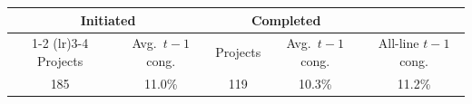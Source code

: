 \begin{table}[!htbp]
\centering
\small
\setlength{\tabcolsep}{6pt}
\renewcommand{\arraystretch}{1.00}
\begin{tabular}{@{}ccccc@{}}
\toprule
\multicolumn{2}{c}{Initiated} & \multicolumn{2}{c}{Completed} & \\
\cmidrule(lr){1-2} \cmidrule(lr){3-4}
Projects & Avg.\ $t\!-\!1$ cong. & Projects & Avg.\ $t\!-\!1$ cong. & All-line $t\!-\!1$ cong. \\
\midrule
185 & 11.0\% & 119 & 10.3\% & 11.2\% \\
\bottomrule
\end{tabular}
\end{table}
